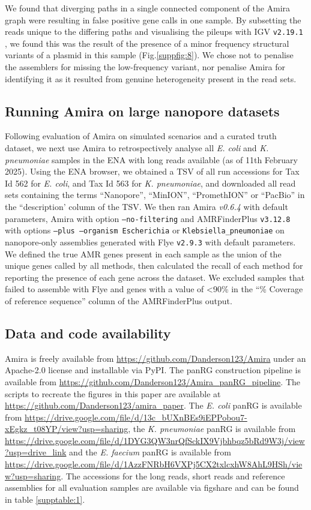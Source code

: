 We found that diverging paths in a single connected component of the Amira graph were resulting in false positive gene calls in one sample. By subsetting the reads unique to the differing paths and visualising the pileups with IGV \texttt{v2.19.1} \cite{10.1093/bib/bbs017}, we found this was the result of the presence of a minor frequency structural variants of a plasmid in this sample (Fig.\ref{suppfig:8}). We chose not to penalise the assemblers for missing the low-frequency variant, nor penalise Amira for identifying it as it resulted from genuine heterogeneity present in the read sets.

\subsection*{Running Amira on large nanopore datasets}

Following evaluation of Amira on simulated scenarios and a curated truth dataset, we next use Amira to retrospectively analyse all \textit{E. coli} and \textit{K. pneumoniae} samples in the ENA with long reads available (as of 11th February 2025). Using the ENA browser, we obtained a TSV of all run accessions for Tax Id 562 for \textit{E. coli}, and Tax Id 563 for \textit{K. pneumoniae}, and downloaded all read sets containing the terms “Nanopore”, “MinION”, “PromethION” or “PacBio” in the “description’ column of the TSV. We then ran Amira \textit{v0.6.4} with default parameters, Amira with option \texttt{–no-filtering} and AMRFinderPlus \texttt{v3.12.8} with options \texttt{–plus –organism Escherichia} or \texttt{Klebsiella\_pneumoniae} on nanopore-only assemblies generated with Flye \texttt{v2.9.3} with default parameters. We defined the true AMR genes present in each sample as the union of the unique genes called by all methods, then calculated the recall of each method for reporting the presence of each gene across the dataset. We excluded samples that failed to assemble with Flye and genes with a value of <90\% in the “\% Coverage of reference sequence” column of the AMRFinderPlus output.

\subsection*{Data and code availability}

Amira is freely available from \url{https://github.com/Danderson123/Amira} under an Apache-2.0 license and installable via PyPI. The panRG construction pipeline is available from \url{https://github.com/Danderson123/Amira_panRG_pipeline}. The scripts to recreate the figures in this paper are available at \url{https://github.com/Danderson123/amira_paper}. The \textit{E. coli} panRG is available from \url{https://drive.google.com/file/d/13c_bUXnBEs9iEPPobou7-xEgkz_t08YP/view?usp=sharing}, the \textit{K. pneumoniae} panRG is available from \url{https://drive.google.com/file/d/1DYG3QW3nrQfSckIX9Vjbhbqz5bRd9W3j/view?usp=drive_link} and the \textit{E. faecium} panRG is available from \url{https://drive.google.com/file/d/1AzzFNRbH6VXPj5CX2txlcxhW8AhL9HSh/view?usp=sharing}. The accessions for the long reads, short reads and reference assemblies for all evaluation samples are available via figshare and can be found in table \ref{supptable:1}.

